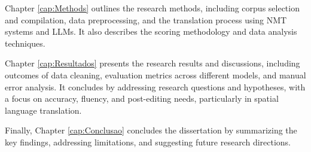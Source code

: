 Chapter \ref{cap:Methods} outlines the research methods, including corpus selection and compilation, data preprocessing, and the translation process using NMT systems and LLMs. It also describes the scoring methodology and data analysis techniques.

Chapter \ref{cap:Resultados} presents the research results and discussions, including outcomes of data cleaning, evaluation metrics across different models, and manual error analysis. It concludes by addressing research questions and hypotheses, with a focus on accuracy, fluency, and post-editing needs, particularly in spatial language translation.

Finally, Chapter \ref{cap:Conclusao} concludes the dissertation by summarizing the key findings, addressing limitations, and suggesting future research directions.




